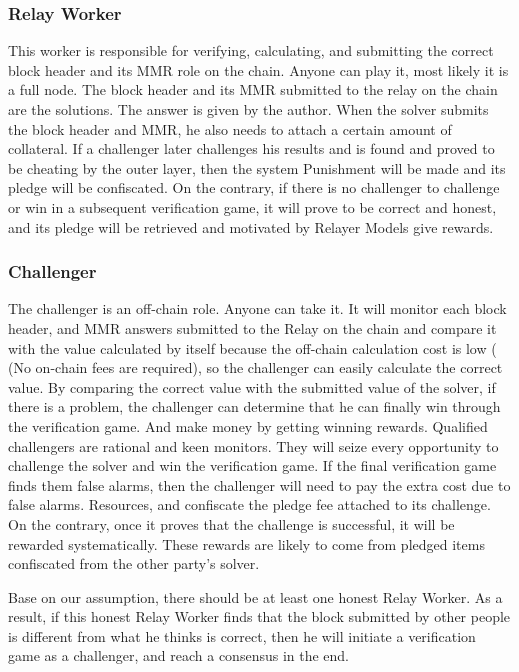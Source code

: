 \subsubsection*{Relay Worker} 

This worker is responsible for verifying, calculating, and submitting the correct block header and its MMR role on the chain. Anyone can play it, most likely it is a full node. The block header and its MMR submitted to the relay on the chain are the solutions. The answer is given by the author. When the solver submits the block header and MMR, he also needs to attach a certain amount of collateral. If a challenger later challenges his results and is found and proved to be cheating by the outer layer, then the system Punishment will be made and its pledge will be confiscated. On the contrary, if there is no challenger to challenge or win in a subsequent verification game, it will prove to be correct and honest, and its pledge will be retrieved and motivated by Relayer Models give rewards.

\subsubsection*{Challenger} 

The challenger is an off-chain role. Anyone can take it. It will monitor each block header, and MMR answers submitted to the Relay on the chain and compare it with the value calculated by itself because the off-chain calculation cost is low ( (No on-chain fees are required), so the challenger can easily calculate the correct value. By comparing the correct value with the submitted value of the solver, if there is a problem, the challenger can determine that he can finally win through the verification game. And make money by getting winning rewards. Qualified challengers are rational and keen monitors. They will seize every opportunity to challenge the solver and win the verification game. If the final verification game finds them false alarms, then the challenger will need to pay the extra cost due to false alarms. Resources, and confiscate the pledge fee attached to its challenge. On the contrary, once it proves that the challenge is successful, it will be rewarded systematically. These rewards are likely to come from pledged items confiscated from the other party's solver.

Base on our assumption, there should be at least one honest Relay Worker. As a result, if this honest Relay Worker finds that the block submitted by other people is different from what he thinks is correct, then he will initiate a verification game as a challenger, and reach a consensus in the end.


